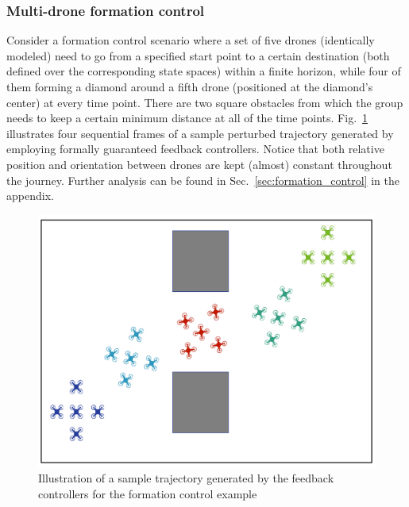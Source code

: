 \subsubsection{Multi-drone formation control}
\label{subsec:formation_control}
Consider a formation control scenario where a set of five drones (identically modeled) need to go from a specified start point to a certain destination (both defined over the corresponding state spaces) within a finite horizon, while four of them forming a diamond around a fifth drone (positioned at the diamond's center) at every time point. There are two square obstacles from which the group needs to keep a certain minimum distance at all of the time points. Fig.~\ref{fig:formation_ex} illustrates four sequential frames of a sample perturbed trajectory generated by employing formally guaranteed feedback controllers. Notice that both 
relative position and orientation between drones are kept (almost) constant 
throughout the journey. 
Further analysis can be found in Sec.~\ref{sec:formation_control} in the appendix.
%
 \begin{figure}[t]
	\centering
	\includegraphics[scale=0.22]{figures/formation.pdf}
	\caption{Illustration of a sample trajectory generated by the feedback controllers for the formation control example}
	\label{fig:formation_ex}
	\vspace{-.4cm}
\end{figure} 

